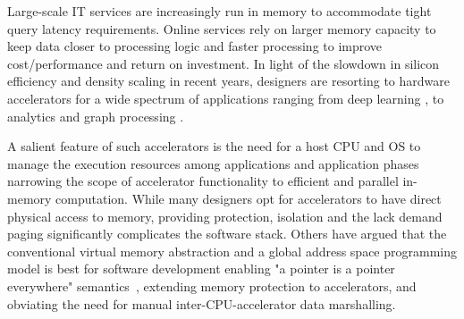 Large-scale IT services are increasingly run in memory to accommodate tight query latency requirements. Online services rely on larger memory capacity to keep data closer to processing logic and faster processing to improve cost/performance and return on investment. In light of the slowdown in silicon efficiency and density scaling in recent years, designers are resorting to hardware accelerators for a wide spectrum of applications ranging from deep learning \cite{}, to analytics\cite{} and graph processing \cite{}. 



A salient feature of such accelerators is the need for a host CPU and OS to manage the execution resources among applications and application phases narrowing the scope of accelerator functionality to efficient and parallel in-memory computation. While many designers opt for accelerators to have direct physical access to memory, providing protection, isolation and the lack demand paging significantly complicates the software stack. Others have argued that the conventional virtual memory abstraction and a global address space programming model is best for software development enabling "a pointer is a pointer everywhere" semantics~\cite{pichai:architectural, power:supporting, vesely:observation}, extending memory protection to accelerators, and obviating the need for manual inter-CPU-accelerator data marshalling.


